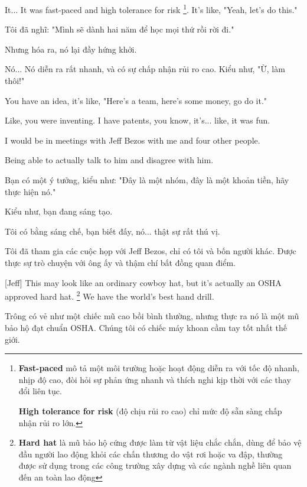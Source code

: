 \documentclass[a4paper]{article}
\begin{document}
	It... It was fast-paced and high tolerance for risk \footnote{
		\textbf{Fast-paced} mô tả một môi trường hoặc hoạt động diễn ra với tốc độ nhanh, nhịp độ cao, đòi hỏi sự phản ứng nhanh và thích nghi kịp thời với các thay đổi liên tục. 
		
		\textbf{High tolerance for risk} (độ chịu rủi ro cao) chỉ mức độ sẵn sàng chấp nhận rủi ro lớn. 
	}. It's like, "Yeah, let's do this."

	\begin{vietnamese-v2}
		
		Tôi đã nghĩ: "Mình sẽ dành hai năm để học mọi thứ rồi rời đi." 
		
		Nhưng hóa ra, nó lại đầy hứng khởi. 
		
		Nó... Nó diễn ra rất nhanh, và có sự chấp nhận rủi ro cao. Kiểu như, "Ừ, làm thôi!"
	\end{vietnamese-v2}

	You have an idea, it's like, "Here's a team, here's some money, go do it."

	Like, you were inventing. I have patents, you know, it's... like, it was fun.

	I would be in meetings with Jeff Bezos with me and four other people.

	Being able to actually talk to him and disagree with him.

	\begin{vietnamese-v2}
		Bạn có một ý tưởng, kiểu như: "Đây là một nhóm, đây là một khoản tiền, hãy thực hiện nó." 
		
		Kiểu như, bạn đang sáng tạo. 
		
		Tôi có bằng sáng chế, bạn biết đấy, nó... thật sự rất thú vị. 
		
		Tôi đã tham gia các cuộc họp với Jeff Bezos, chỉ có tôi và bốn người khác. Được thực sự trò chuyện với ông ấy và thậm chí bất đồng quan điểm.
	\end{vietnamese-v2}

	[Jeff] This may look like an ordinary cowboy hat, but it's actually an OSHA approved hard hat. \footnote{
		\textbf{Hard hat} là mũ bảo hộ cứng được làm từ vật liệu chắc chắn, dùng để bảo vệ đầu người lao động khỏi các chấn thương do vật rơi hoặc va đập, thường được sử dụng trong các công trường xây dựng và các ngành nghề liên quan đến an toàn lao động
	
	}
	We have the world's best hand drill.
	
	\begin{vietnamese-v2}
		[Jeff] Trông có vẻ như một chiếc mũ cao bồi bình thường, nhưng thực ra nó là một mũ bảo hộ đạt chuẩn OSHA. Chúng tôi có chiếc máy khoan cầm tay tốt nhất thế giới.	
	\end{vietnamese-v2}
	
\end{document}
